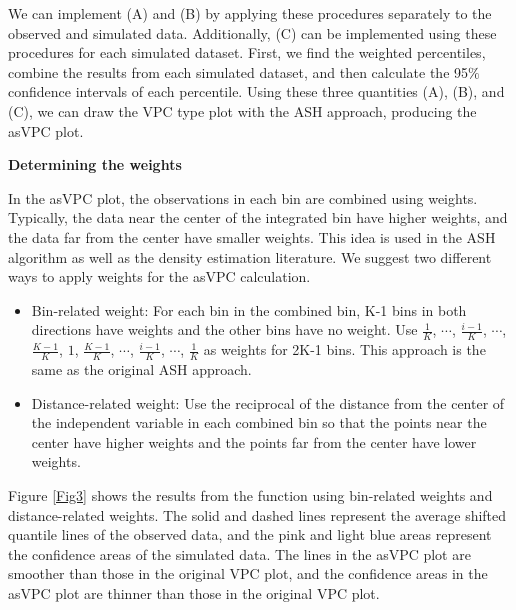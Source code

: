 We can implement (A) and (B) by applying these procedures separately to the observed and simulated data. Additionally, (C) can be implemented using these procedures for each simulated dataset. First, we find the weighted percentiles, combine the results from each simulated dataset, and then calculate the 95$\%$ confidence intervals of each percentile. Using these three quantities (A), (B), and (C), we can draw the VPC type plot with the ASH approach, producing the asVPC plot.

\vspace{0.1in}
\noindent
\textbf{Determining the weights}

In the asVPC plot, the observations in each bin are combined using weights. Typically, the data near the center of the integrated bin have higher weights, and the data far from the center have smaller weights. This idea is used in the ASH algorithm as well as the density estimation literature. We suggest two different ways to apply weights for the asVPC calculation.


\begin{itemize}
\item	Bin-related weight: For each bin in the combined bin, K-1 bins in both directions have weights and the other bins have no weight. Use $\frac{1}{K}$, $\cdots$, $\frac{i-1}{K}$, $\cdots$, $\frac{K-1}{K}$, $1$, $\frac{K-1}{K}$, $\cdots$, $\frac{i-1}{K}$, $\cdots$, $\frac{1}{K}$ as weights for 2K-1 bins. This approach is the same as the original ASH approach.
\item	Distance-related weight: Use the reciprocal of the distance from the center of the independent variable in each combined bin so that the points near the center have higher weights and the points far from the center have lower weights.
\end{itemize}

Figure \ref{Fig3} shows the results from the  function using bin-related weights and distance-related weights. The solid and dashed lines represent the average shifted quantile lines of the observed data, and the pink and light blue areas represent the confidence areas of the simulated data. The lines in the asVPC plot are smoother than those in the original VPC plot, and the confidence areas in the asVPC plot are thinner than those in the original VPC plot.


